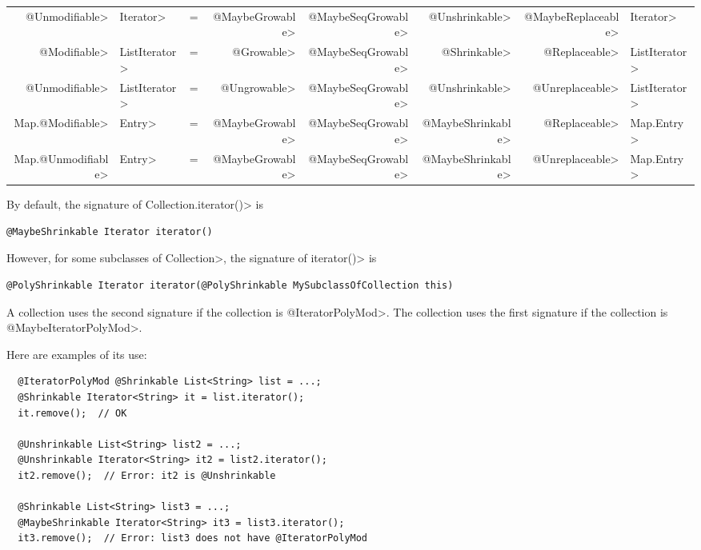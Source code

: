 \begin{smaller}
\begin{tabular}{rlcrrrrl}
\<@Unmodifiable> & \<Iterator> & = & \<@MaybeGrowable> & \<@MaybeSeqGrowable> & \<@Unshrinkable> & \<@MaybeReplaceable> & \<Iterator> \\
\<@Modifiable> & \<ListIterator> & = & \<@Growable> & \<@MaybeSeqGrowable> & \<@Shrinkable> & \<@Replaceable> & \<ListIterator> \\
\<@Unmodifiable> & \<ListIterator> & = & \<@Ungrowable> & \<@MaybeSeqGrowable> & \<@Unshrinkable> & \<@Unreplaceable> & \<ListIterator> \\
\<Map.@Modifiable> & \<Entry> & = & \<@MaybeGrowable> & \<@MaybeSeqGrowable> & \<@MaybeShrinkable> & \<@Replaceable> & \<Map.Entry> \\
\<Map.@Unmodifiable> & \<Entry> & = & \<@MaybeGrowable> & \<@MaybeSeqGrowable> & \<@MaybeShrinkable> & \<@Unreplaceable> & \<Map.Entry> \\
\end{tabular}
\end{smaller}



By default, the signature of \<Collection.iterator()> is

\begin{Verbatim}
@MaybeShrinkable Iterator iterator()
\end{Verbatim}

However, for some subclasses of \<Collection>, the signature of
\<iterator()> is

\begin{Verbatim}
@PolyShrinkable Iterator iterator(@PolyShrinkable MySubclassOfCollection this)
\end{Verbatim}

A collection uses the second signature if the collection is
\<@IteratorPolyMod>.  The collection uses the first signature if the
collection is \<@MaybeIteratorPolyMod>.

Here are examples of its use:

\begin{Verbatim}
  @IteratorPolyMod @Shrinkable List<String> list = ...;
  @Shrinkable Iterator<String> it = list.iterator();
  it.remove();  // OK

  @Unshrinkable List<String> list2 = ...;
  @Unshrinkable Iterator<String> it2 = list2.iterator();
  it2.remove();  // Error: it2 is @Unshrinkable

  @Shrinkable List<String> list3 = ...;
  @MaybeShrinkable Iterator<String> it3 = list3.iterator();
  it3.remove();  // Error: list3 does not have @IteratorPolyMod
\end{Verbatim}


